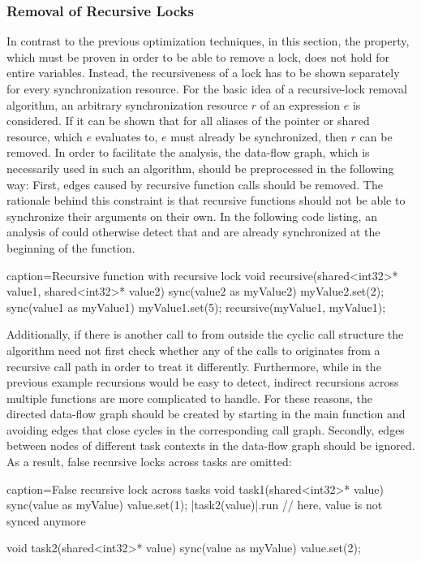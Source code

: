 \subsubsection{Removal of Recursive Locks}
In contrast to the previous optimization techniques, in this section, the property, which must be proven in order to be able to remove a lock, does not hold for entire variables. Instead, the recursiveness of a lock has to be shown separately for every synchronization resource. For the basic idea of a recursive-lock removal algorithm, an arbitrary synchronization resource $r$ of an expression $e$ is considered. If it can be shown that for all aliases of the pointer or shared resource, which $e$ evaluates to, $e$ must already be synchronized, then $r$ can be removed. In order to facilitate the analysis, the data-flow graph, which is necessarily used in such an algorithm, should be preprocessed in the following way: First, edges caused by recursive function calls should be removed. The rationale behind this constraint is that recursive functions should not be able to synchronize their arguments on their own. In the following code listing, an analysis of  could otherwise  detect that  and  are already synchronized at the beginning of the function.

\begin{ccode}{caption=Recursive function with recursive lock}
void recursive(shared<int32>* value1, shared<int32>* value2) {
  sync(value2 as myValue2) {
    myValue2.set(2);
  }
  sync(value1 as myValue1) {
    myValue1.set(5);
    recursive(myValue1, myValue1);
  }
}
\end{ccode}

Additionally, if there is another call to  from outside the cyclic call structure the algorithm need not first check whether any of the calls to  originates from a recursive call path in order to treat it differently. Furthermore, while in the previous example recursions would be easy to detect, indirect recursions across multiple functions are more complicated to handle. For these reasons, the directed data-flow graph should be created by starting in the main function and avoiding edges that close cycles in the corresponding call graph. Secondly, edges between nodes of different task contexts in the data-flow graph should be ignored. As a result, false recursive locks across tasks are omitted:

\begin{ccode}{caption=False recursive lock across tasks}
void task1(shared<int32>* value) {
  sync(value as myValue) { value.set(1); 
    |task2(value)|.run                   // here, value is not synced anymore
  }
}

void task2(shared<int32>* value) {
  sync(value as myValue) { value.set(2); }
}
\end{ccode}


